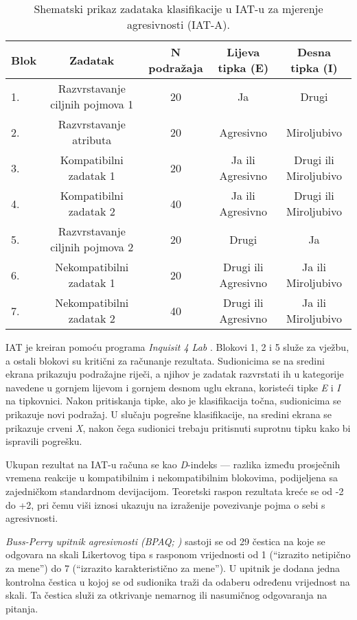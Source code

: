 \documentclass[a4paper, 12pt]{report}
\begin{document}
\begin{table}[h!]
    \centering
    \caption{\label{iata}Shematski prikaz zadataka klasifikacije u IAT-u za
        mjerenje agresivnosti (IAT-A).}
    \hspace*{-0.5cm}\begin{tabular}{l*{4}{c}}
        \toprule
        Blok & Zadatak & N podražaja & Lijeva tipka (E) & Desna tipka (I)\\
        \midrule
        1. & Razvrstavanje ciljnih pojmova 1& 20 & Ja & Drugi\\
        2. & Razvrstavanje atributa & 20 & Agresivno & Miroljubivo\\
        3. & Kompatibilni zadatak 1 & 20 & Ja ili Agresivno & Drugi ili Miroljubivo\\
        4. & Kompatibilni zadatak 2 & 40 & Ja ili Agresivno & Drugi ili Miroljubivo\\
        5. & Razvrstavanje ciljnih pojmova 2 & 20 & Drugi & Ja\\
        6. & Nekompatibilni zadatak 1 & 20 & Drugi ili Agresivno & Ja ili Miroljubivo\\
        7. & Nekompatibilni zadatak 2 & 40 & Drugi ili Agresivno & Ja ili Miroljubivo\\
        \bottomrule
    \end{tabular}
\end{table}

IAT je kreiran pomoću programa \emph{Inquisit 4 Lab} \citep{inq}. 
Blokovi 1, 2 i 5 služe za vježbu, a ostali blokovi su kritični za
računanje rezultata. Sudionicima se na sredini ekrana prikazuju podražajne
riječi, a njihov je zadatak razvrstati ih u kategorije navedene u gornjem
lijevom i gornjem desnom uglu ekrana, koristeći tipke \emph{E} i \emph{I} na
tipkovnici. Nakon pritiskanja tipke, ako je klasifikacija točna,
sudionicima se prikazuje novi podražaj. U slučaju pogrešne klasifikacije, na
sredini ekrana se prikazuje crveni \emph{X}, nakon čega sudionici trebaju
pritisnuti suprotnu tipku kako bi ispravili pogrešku.

Ukupan rezultat na IAT-u računa se kao \emph{D}-indeks ---
razlika između prosječnih vremena reakcije u kompatibilnim i nekompatibilnim
blokovima, podijeljena sa zajedničkom standardnom devijacijom.
Teoretski raspon rezultata kreće se od -2 do +2, pri čemu viši iznosi ukazuju na
izraženije povezivanje pojma o sebi s agresivnosti.

\emph{Buss-Perry upitnik agresivnosti (BPAQ; \citealp{buss1992aggression})}  sastoji se od
29 čestica na koje se odgovara na skali Likertovog tipa s rasponom vrijednosti
od 1 (\enquote{izrazito netipično za mene}) do 7 (\enquote{izrazito
    karakteristično za mene}). U upitnik je dodana jedna kontrolna čestica u
kojoj se od sudionika traži da odaberu određenu vrijednost na skali. Ta čestica
služi za otkrivanje nemarnog ili nasumičnog odgovaranja na pitanja.
\end{document}
